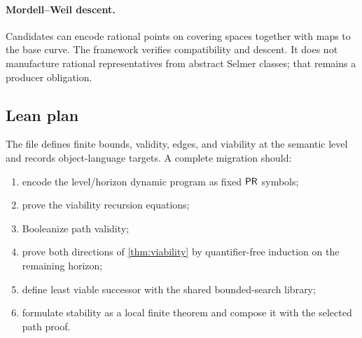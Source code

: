 \paragraph{Mordell--Weil descent.}
Candidates can encode rational points on covering spaces together with maps to
the base curve.  The framework verifies compatibility and descent.  It does
not manufacture rational representatives from abstract Selmer classes; that
remains a producer obligation.

\subsection{Lean plan}

The file  defines finite bounds, validity,
edges, and viability at the semantic level and records object-language targets.
A complete migration should:
\begin{enumerate}
\item encode the level/horizon dynamic program as fixed \(\mathsf{PR}\) symbols;
\item prove the viability recursion equations;
\item Booleanize path validity;
\item prove both directions of \cref{thm:viability} by quantifier-free
induction on the remaining horizon;
\item define least viable successor with the shared bounded-search library;
\item formulate stability as a local finite theorem and compose it with the
selected path proof.
\end{enumerate}
